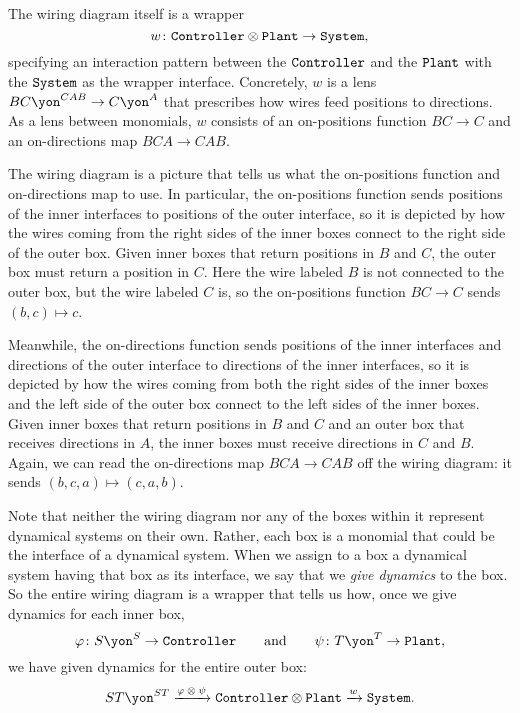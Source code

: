 \documentclass[Book-Poly]{subfiles}
\begin{document}
\begin{example}
The wiring diagram itself is a wrapper
\[
	w\colon\texttt{Controller}\otimes\texttt{Plant}\to\texttt{System},
\]
specifying an interaction pattern between the $\texttt{Controller}$ and the $\texttt{Plant}$ with the $\texttt{System}$ as the wrapper interface.
Concretely, $w$ is a lens $BC\yon^{CAB}\to C\yon^A$ that prescribes how wires feed positions to directions.
As a lens between monomials, $w$ consists of an on-positions function $BC\to C$ and an on-directions map $BCA\to CAB$.

The wiring diagram is a picture that tells us what the on-positions function and on-directions map to use.
In particular, the on-positions function sends positions of the inner interfaces to positions of the outer interface, so it is depicted by how the wires coming from the right sides of the inner boxes connect to the right side of the outer box.
Given inner boxes that return positions in $B$ and $C$, the outer box must return a position in $C$.
Here the wire labeled $B$ is not connected to the outer box, but the wire labeled $C$ is, so the on-positions function $BC\to C$ sends $(b,c)\mapsto c$.

Meanwhile, the on-directions function sends positions of the inner interfaces and directions of the outer interface to directions of the inner interfaces, so it is depicted by how the wires coming from both the right sides of the inner boxes and the left side of the outer box connect to the left sides of the inner boxes.
Given inner boxes that return positions in $B$ and $C$ and an outer box that receives directions in $A$, the inner boxes must receive directions in $C$ and $B$.
Again, we can read the on-directions map $BCA\to CAB$ off the wiring diagram: it sends $(b,c,a)\mapsto (c,a,b)$.

Note that neither the wiring diagram nor any of the boxes within it represent dynamical systems on their own.
Rather, each box is a monomial that could be the interface of a dynamical system.
When we assign to a box a dynamical system having that box as its interface, we say that we \emph{give dynamics} to the box.
So the entire wiring diagram is a wrapper that tells us how, once we give dynamics for each inner box,
\[
\varphi\colon S\yon^S\to\const{Controller}
\qqand
\psi\colon T\yon^T\to\const{Plant},
\]
we have given dynamics for the entire outer box:
\[
ST\yon^{ST}\To{\varphi\:\otimes\:\psi}\const{Controller}\otimes\const{Plant}\To{w}\const{System}.
\]
\end{example}
\end{document}
